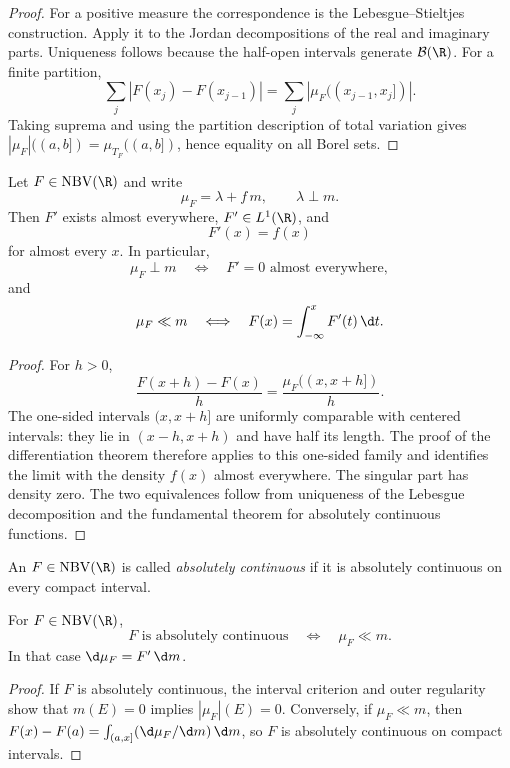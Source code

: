 \begin{proof}
For a positive measure the correspondence is the Lebesgue--Stieltjes construction. Apply it to the Jordan decompositions of the real and imaginary parts. Uniqueness follows because the half-open intervals generate $\cB(\R)$. For a finite partition,
\[
\sum_j|F(x_j)-F(x_{j-1})|
 =\sum_j|\mu_F((x_{j-1},x_j])|.
\]
Taking suprema and using the partition description of total variation gives $|\mu_F|((a,b])=\mu_{T_F}((a,b])$, hence equality on all Borel sets.
\end{proof}

\begin{thm}
Let $F\in\NBV(\R)$ and write
\[
\mu_F=\lambda+f\,m,
\qquad \lambda\perp m.
\]
Then $F'$ exists almost everywhere, $F'\in L^1(\R)$, and
\[
F'(x)=f(x)
\]
for almost every $x$. In particular,
\[
\mu_F\perp m\quad\Longleftrightarrow\quad F'=0\text{ almost everywhere},
\]
and
\[
\mu_F\ll m
\quad\Longleftrightarrow\quad
F(x)=\int_{-\infty}^xF'(t)\,\d t.
\]
\end{thm}

\begin{proof}
For $h>0$,
\[
\frac{F(x+h)-F(x)}h
 =\frac{\mu_F((x,x+h])}{h}.
\]
The one-sided intervals $(x,x+h]$ are uniformly comparable with centered intervals: they lie in $(x-h,x+h)$ and have half its length. The proof of the differentiation theorem therefore applies to this one-sided family and identifies the limit with the density $f(x)$ almost everywhere. The singular part has density zero. The two equivalences follow from uniqueness of the Lebesgue decomposition and the fundamental theorem for absolutely continuous functions.
\end{proof}

\begin{de}
An $F\in\NBV(\R)$ is called \emph{absolutely continuous} if it is absolutely continuous on every compact interval.
\end{de}

\begin{prop}
For $F\in\NBV(\R)$,
\[
F\text{ is absolutely continuous}
\quad\Longleftrightarrow\quad
\mu_F\ll m.
\]
In that case $\d\mu_F=F'\,\d m$.
\end{prop}

\begin{proof}
If $F$ is absolutely continuous, the interval criterion and outer regularity show that $m(E)=0$ implies $|\mu_F|(E)=0$. Conversely, if $\mu_F\ll m$, then $F(x)-F(a)=\int_{(a,x]}(\d\mu_F/\d m)\,\d m$, so $F$ is absolutely continuous on compact intervals.
\end{proof}

